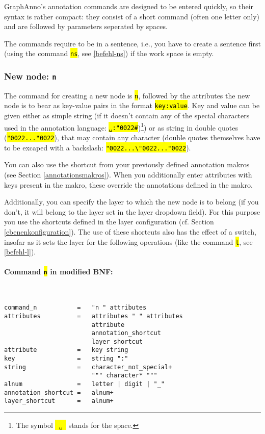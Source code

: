 \documentclass[12pt]{scrartcl}
\newcommand{\quo}{\char"0022}
\newcommand{\code}[1]{\hl{\texttt{#1}}}
\begin{document}
GraphAnno’s annotation commands are designed to be entered quickly, so their syntax is rather compact:
they consist of a short command (often one letter only) and are followed by parameters seperated by spaces.

The commands require to be in a sentence, i.e., you have to create a sentence first (using the command \code{ns}, see \ref{befehl-ns}) if the work space is empty.


\subsubsection{New node: \texttt{n}}\label{befehl-n}

The command for creating a new node is \code{n}, followed by the attributes the new node is to bear as key-value pairs in the format \code{key:value}.
Key and value can be given either as simple string (if it doesn’t contain any of the special characters used in the annotation language: \code{␣:\quo\#})\footnote{The symbol \code{\mbox{\,␣\,}} stands for the space.}) or as string in double quotes (\code{\quo...\quo}), that may contain any character (double quotes themselves have to be excaped with a backslash: \code{\quo...\textbackslash\quo...\quo}).

You can also use the shortcut from your previously defined annotation makros (see Section \ref{annotationsmakros}).
When you additionally enter attributes with keys present in the makro, these override the annotations defined in the makro.

Additionally, you can specify the layer to which the new node is to belong (if you don’t, it will belong to the layer set in the layer dropdown field).
For this purpose you use the shortcuts defined in the layer configuration (cf. Section \ref{ebenenkonfiguration}).
The use of these shortcuts also has the effect of a switch, insofar as it sets the layer for the following operations (like the command \code{l}, see \ref{befehl-l}).

\paragraph*{Command \code{n} in modified BNF:}
~
\begin{lstlisting}
command_n           =   "n " attributes
attributes          =   attributes " " attributes
                        attribute
                        annotation_shortcut
                        layer_shortcut
attribute           =   key string
key                 =   string ":"
string              =   character_not_special+
                        """ character* """
alnum               =   letter | digit | "_"
annotation_shortcut =   alnum+
layer_shortcut      =   alnum+
\end{lstlisting}
\end{document}
